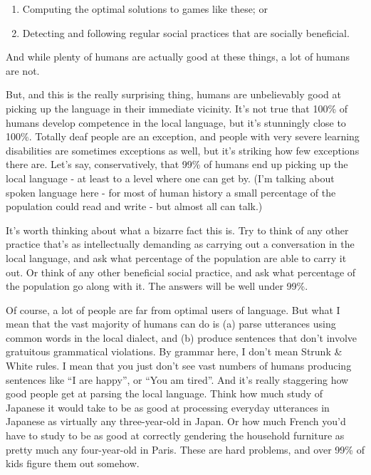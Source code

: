\documentclass[
  11pt,
]{article}
\providecommand{\tightlist}{%
  \setlength{\itemsep}{0pt}\setlength{\parskip}{0pt}}
\begin{document}
\begin{enumerate}
\def\labelenumi{\arabic{enumi}.}
\tightlist
\item
  Computing the optimal solutions to games like these; or
\item
  Detecting and following regular social practices that are socially
  beneficial.
\end{enumerate}

And while plenty of humans are actually good at these things, a lot of
humans are not.

But, and this is the really surprising thing, humans are unbelievably
good at picking up the language in their immediate vicinity. It's not
true that 100\% of humans develop competence in the local language, but
it's stunningly close to 100\%. Totally deaf people are an exception,
and people with very severe learning disabilities are sometimes
exceptions as well, but it's striking how few exceptions there are.
Let's say, conservatively, that 99\% of humans end up picking up the
local language - at least to a level where one can get by. (I'm talking
about spoken language here - for most of human history a small
percentage of the population could read and write - but almost all can
talk.)

It's worth thinking about what a bizarre fact this is. Try to think of
any other practice that's as intellectually demanding as carrying out a
conversation in the local language, and ask what percentage of the
population are able to carry it out. Or think of any other beneficial
social practice, and ask what percentage of the population go along with
it. The answers will be well under 99\%.

Of course, a lot of people are far from optimal users of language. But
what I mean that the vast majority of humans can do is (a) parse
utterances using common words in the local dialect, and (b) produce
sentences that don't involve gratuitous grammatical violations. By
grammar here, I don't mean Strunk \& White rules. I mean that you just
don't see vast numbers of humans producing sentences like ``I are
happy'', or ``You am tired''. And it's really staggering how good people
get at parsing the local language. Think how much study of Japanese it
would take to be as good at processing everyday utterances in Japanese
as virtually any three-year-old in Japan. Or how much French you'd have
to study to be as good at correctly gendering the household furniture as
pretty much any four-year-old in Paris. These are hard problems, and
over 99\% of kids figure them out somehow.
\end{document}

